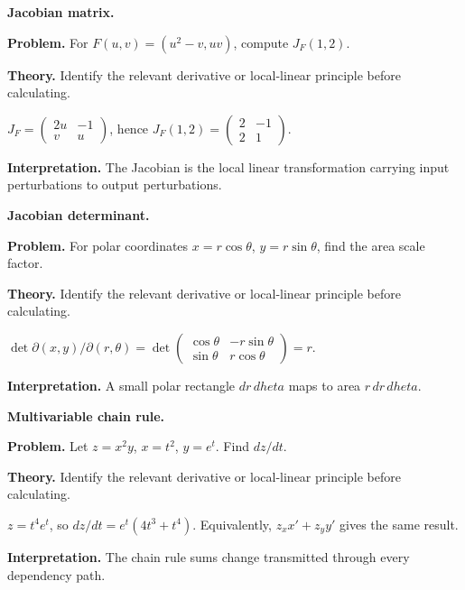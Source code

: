 \begin{workedexample}
\textbf{Jacobian matrix.}\par
\textbf{Problem.} For $F(u,v)=(u^2-v,uv)$, compute $J_F(1,2)$.

\textbf{Theory.} Identify the relevant derivative or local-linear principle before calculating.

\begin{solution}
$J_F=\begin{pmatrix}2u&-1\\v&u\end{pmatrix}$, hence $J_F(1,2)=\begin{pmatrix}2&-1\\2&1\end{pmatrix}$.

\textbf{Interpretation.} The Jacobian is the local linear transformation carrying input perturbations to output perturbations.
\end{solution}
\end{workedexample}

\begin{workedexample}
\textbf{Jacobian determinant.}\par
\textbf{Problem.} For polar coordinates $x=r\cos\theta$, $y=r\sin\theta$, find the area scale factor.

\textbf{Theory.} Identify the relevant derivative or local-linear principle before calculating.

\begin{solution}
$\det\partial(x,y)/\partial(r,\theta)=\det\begin{pmatrix}\cos\theta&-r\sin\theta\\\sin\theta&r\cos\theta\end{pmatrix}=r$.

\textbf{Interpretation.} A small polar rectangle $dr\,d	heta$ maps to area $r\,dr\,d	heta$.
\end{solution}
\end{workedexample}

\begin{workedexample}
\textbf{Multivariable chain rule.}\par
\textbf{Problem.} Let $z=x^2y$, $x=t^2$, $y=e^t$. Find $dz/dt$.

\textbf{Theory.} Identify the relevant derivative or local-linear principle before calculating.

\begin{solution}
$z=t^4e^t$, so $dz/dt=e^t(4t^3+t^4)$. Equivalently, $z_xx'+z_yy'$ gives the same result.

\textbf{Interpretation.} The chain rule sums change transmitted through every dependency path.
\end{solution}
\end{workedexample}

